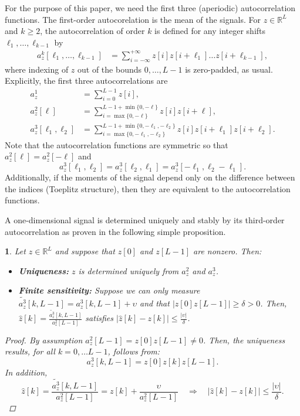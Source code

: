 \documentclass[english,11pt]{article}
\numberwithin{equation}{section}
\theoremstyle{plain}
\theoremstyle{definition}
\theoremstyle{remark}
\theoremstyle{plain}
\theoremstyle{remark}
\theoremstyle{plain}
\theoremstyle{plain}
\newtheorem{proposition}[thm]{\protect\propositionname}
\providecommand{\propositionname}{Proposition}
\newcommand{\RL}{\mathbb{R}^L}
\begin{document}
For the purpose of this paper, we need the first three (aperiodic) autocorrelation functions. The first-order autocorelation is the mean of the signals. For  
$z\in\RL$ and $k\geq 2$, the autocorrelation of order $k$ is defined for any integer shifts $\ell_1, \ldots, \ell_{k-1}$ by
\begin{align}
	a_z^k[\ell_1,\ldots,\ell_{k-1}]  & = \sum_{i=-\infty}^{+\infty} z[i]z[i+\ell_1]\ldots z[i+\ell_{k-1}],
	\label{eq:ac_general}
\end{align}
where indexing of $z$ out of the bounds $0, \ldots, L-1$ is zero-padded, as usual.
Explicitly, the first three autocorrelations are
\begin{align} 
	a_z^1 & = \sum_{i=0}^{L-1} z[i], \nonumber\\
	a_z^2[\ell] & = \sum_{i = \max\{0, -\ell\}}^{L-1 + \min\{0, -\ell\}} z[i]z[i+\ell], \nonumber\\
	a_z^3[\ell_1,\ell_2] & = \sum_{i = \max\{0, -\ell_1, -\ell_2\}}^{L-1 + \min\{0, -\ell_1, -\ell_2\}} z[i]z[i+\ell_1]z[i+\ell_2]. \label{eq:ac_special}
\end{align}
Note that the autocorrelation functions are symmetric so that $a_z^2[\ell] = a_z^2[-\ell]$ and $$a_z^3[\ell_1,\ell_2] = a_z^3[\ell_2,\ell_1]=a_z^3[-\ell_1,\ell_2-\ell_1].$$
Additionally, if the moments of the signal depend only on the difference between the indices (Toeplitz structure), then they are equivalent to the autocorrelation functions.

A one-dimensional signal is determined uniquely and stably by its third-order autocorrelation as proven in the following simple proposition.
\begin{proposition} \label{prop:uniqueness}
	Let $z\in\RL$ and suppose that $z[0]$ and $z[L-1]$ are nonzero. Then:
	\begin{itemize}
		\item \textbf{Uniqueness:} 	 $z$  is determined uniquely from  $a_z^2$ and $a_z^3$.
        \item \textbf{Finite sensitivity:} 	Suppose we can only measure $\tilde{a_z^3}[k,L-1] = a_z^3[k,L-1]+\upsilon$ and that $\vert z[0]z[L-1]\vert \geq \delta>0$.
         Then,  $\hat{z}[k] =\frac{\tilde{a_z^3}[k,L-1]}{a_z^2[L-1]} $ satisfies $\vert \hat{z}[k] - z[k]\vert\leq \frac{\vert \upsilon\vert }{\delta}$. 
	\end{itemize}
	\begin{proof}
		By assumption $a_z^2[L-1] = z[0]z[L-1]\neq 0$.
		Then, the uniqueness results, for all $k=0,\ldots L-1$,  follows from:
		\begin{equation*}
		a_z^3[k,L-1] = z[0]z[k]z[L-1].
		\end{equation*}
		In addition, 
		\begin{equation*}
		\hat{z}[k] = \frac{\tilde{a_z^3}[k,L-1]}{a_z^2[L-1]} = z[k]+\frac{\upsilon}{a_z^2[L-1]} \quad \Rightarrow \quad \vert \hat{z}[k] - {z}[k]\vert \leq \frac{\vert\upsilon\vert}{\delta}.
		\end{equation*} 
	\end{proof}
\end{proposition}
\end{document}
